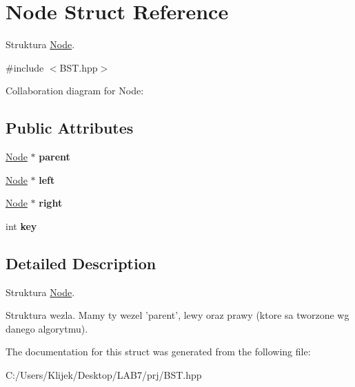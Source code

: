 \hypertarget{struct_node}{\section{Node Struct Reference}
\label{struct_node}
}


Struktura \hyperlink{struct_node}{Node}.  




{\ttfamily \#include $<$B\-S\-T.\-hpp$>$}



Collaboration diagram for Node\-:
\subsection*{Public Attributes}
\begin{DoxyCompactItemize}
\item 
\hypertarget{struct_node_ad8184598cdea70e4bbdfd76f2b0f9e85}{\hyperlink{struct_node}{Node} $\ast$ {\bfseries parent}}\label{struct_node_ad8184598cdea70e4bbdfd76f2b0f9e85}

\item 
\hypertarget{struct_node_a3ca572db95a35de41c87e70c3e8fb5a7}{\hyperlink{struct_node}{Node} $\ast$ {\bfseries left}}\label{struct_node_a3ca572db95a35de41c87e70c3e8fb5a7}

\item 
\hypertarget{struct_node_afe5916d969cd32f7de1e4ba15580c989}{\hyperlink{struct_node}{Node} $\ast$ {\bfseries right}}\label{struct_node_afe5916d969cd32f7de1e4ba15580c989}

\item 
\hypertarget{struct_node_a3020957813f200a9da836428aad2d8d7}{int {\bfseries key}}\label{struct_node_a3020957813f200a9da836428aad2d8d7}

\end{DoxyCompactItemize}


\subsection{Detailed Description}
Struktura \hyperlink{struct_node}{Node}. 

Struktura wezla. Mamy ty wezel 'parent', lewy oraz prawy (ktore sa tworzone wg danego algorytmu). 

The documentation for this struct was generated from the following file\-:\begin{DoxyCompactItemize}
\item 
C\-:/\-Users/\-Klijek/\-Desktop/\-L\-A\-B7/prj/B\-S\-T.\-hpp\end{DoxyCompactItemize}
